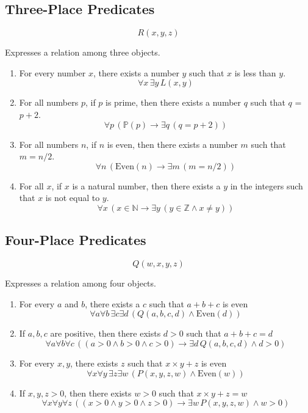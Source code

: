\documentclass[12pt,a4paper,openany]{article}
\begin{document}
\subsection{Three-Place Predicates}\label{three-place-predicates}

\[R(x,y,z)\]

Expresses a relation among three objects.

\begin{enumerate}
\def\labelenumi{\arabic{enumi}.}
\item
  For every number \(x\), there exists a number \(y\) such that \(x\) is
  less than \(y\). \[\forall x \, \exists y \, L(x,y)\]
\item
  For all numbers \(p\), if \(p\) is prime, then there exists a number
  \(q\) such that \(q\) = \(p + 2\).
  \[\forall p \, (\mathbb{P}(p) \to \exists q \, (q = p+2))\]
\item
  For all numbers \(n\), if \(n\) is even, then there exists a number
  \(m\) such that \(m = n/2\).
  \[\forall n \, (\text{Even}(n) \to \exists m \, (m = n/2))\]
\item
  For all \(x\), if \(x\) is a natural number, then there exists a \(y\)
  in the integers such that \(x\) is not equal to \(y\).
  \[\forall x \, (x \in \mathbb{N} \to \exists y \, (y \in \mathbb{Z} \land x \neq y))\]
\end{enumerate}

\subsection{Four-Place Predicates}\label{four-place-predicates}

\[Q(w,x,y,z)\]

Expresses a relation among four objects.

\begin{enumerate}
\item
  For every \(a\) and \(b\), there exists a \(c\) such that \(a+b+c\) is
  even
  \[\forall a \forall b \, \exists c \exists d \, (Q(a,b,c,d) \land \text{Even}(d))\]
\item
  If \(a,b,c\) are positive, then there exists \(d>0\) such that
  \(a+b+c=d\)
  \[\forall a \forall b \forall c \, ((a>0 \land b>0 \land c>0) \to \exists d \, Q(a,b,c,d) \land d>0)\]
\item
  For every \(x,y\), there exists \(z\) such that \(x \times y + z\) is
  even
  \[\forall x \forall y \, \exists z \exists w \, (P(x,y,z,w) \land \text{Even}(w))\]
\item
  If \(x,y,z>0\), then there exists \(w>0\) such that
  \(x \times y + z = w\)
  \[\forall x \forall y \forall z \, ((x>0 \land y>0 \land z>0) \to \exists w \, P(x,y,z,w) \land w>0)\]
\end{enumerate}
\end{document}
